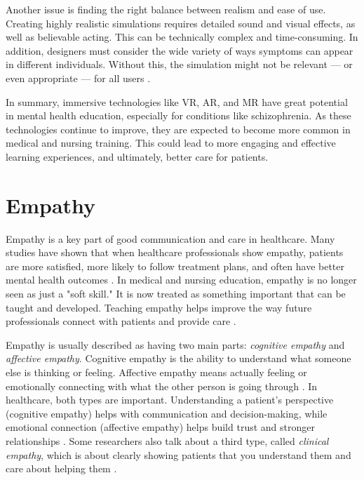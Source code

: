 Another issue is finding the right balance between realism and ease of use. Creating highly realistic simulations requires detailed sound and visual effects, as well as believable acting. This can be technically complex and time-consuming. In addition, designers must consider the wide variety of ways symptoms can appear in different individuals. Without this, the simulation might not be relevant — or even appropriate — for all users \cite{Zare-Bidaki2022}.

In summary, immersive technologies like VR, AR, and MR have great potential in mental health education, especially for conditions like schizophrenia. As these technologies continue to improve, they are expected to become more common in medical and nursing training. This could lead to more engaging and effective learning experiences, and ultimately, better care for patients.

\section{Empathy}

Empathy is a key part of good communication and care in healthcare. Many studies have shown that when healthcare professionals show empathy, patients are more satisfied, more likely to follow treatment plans, and often have better mental health outcomes \cite{Cunico2012, Olson1995, Ozcan2018}. In medical and nursing education, empathy is no longer seen as just a "soft skill." It is now treated as something important that can be taught and developed. Teaching empathy helps improve the way future professionals connect with patients and provide care \cite{Cunico2012}.

Empathy is usually described as having two main parts: \textit{cognitive empathy} and \textit{affective empathy}. Cognitive empathy is the ability to understand what someone else is thinking or feeling. Affective empathy means actually feeling or emotionally connecting with what the other person is going through \cite{Ventura2020, Martingano2021}. In healthcare, both types are important. Understanding a patient's perspective (cognitive empathy) helps with communication and decision-making, while emotional connection (affective empathy) helps build trust and stronger relationships \cite{Cunico2012, Ozcan2018}. Some researchers also talk about a third type, called \textit{clinical empathy}, which is about clearly showing patients that you understand them and care about helping them \cite{Hojat2002}.

